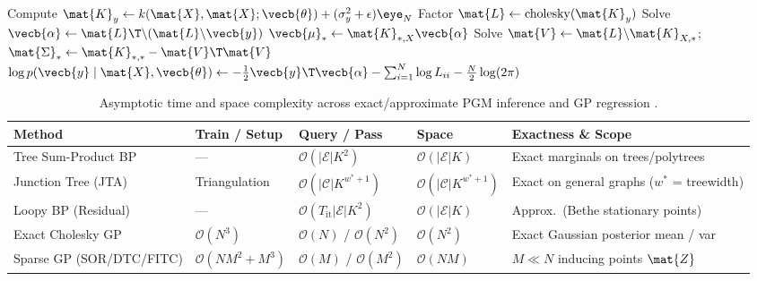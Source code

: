 \documentclass[../../../../master.tex]{subfiles}
\begin{document}
\begin{algorithm}[htbp]
\caption{Numerically Stable Cholesky GP Regression \& Marginal Likelihood}
\label{alg:pgmgp:cholesky_gp}
Compute $\mat{K}_y \gets k(\mat{X}, \mat{X}; \vecb{\theta}) + (\sigma_y^2 + \epsilon)\eye_N$\;
Factor $\mat{L} \gets \mathrm{cholesky}(\mat{K}_y)$ 
Solve $\vecb{\alpha} \gets \mat{L}\T \backslash (\mat{L} \backslash \vecb{y})$ 
$\vecb{\mu}_* \gets \mat{K}_{*,X} \vecb{\alpha}$\;
Solve $\mat{V} \gets \mat{L} \backslash \mat{K}_{X,*}$; \quad $\mat{\Sigma}_* \gets \mat{K}_{*,*} - \mat{V}\T \mat{V}$\;
$\log p(\vecb{y} \mid \mat{X}, \vecb{\theta}) \gets -\frac{1}{2}\vecb{y}\T\vecb{\alpha} - \sum_{i=1}^N \log L_{ii} - \frac{N}{2}\log(2\pi)$\;
\end{algorithm}

\begin{table}[htbp]
\centering
\caption{Asymptotic time and space complexity across exact/approximate PGM inference and GP regression .}
\label{tab:pgmgp:complexity}
{\small
\begin{tabularx}{\textwidth}{@{}>{\raggedright\arraybackslash}p{3.0cm} l l l >{\raggedright\arraybackslash}X@{}}
\toprule
\textbf{Method} & \textbf{Train / Setup} & \textbf{Query / Pass} & \textbf{Space} & \textbf{Exactness \& Scope} \\
\midrule
Tree Sum-Product BP & --- & $\mathcal{O}(|\mathcal{E}| K^2)$ & $\mathcal{O}(|\mathcal{E}| K)$ & Exact marginals on trees/polytrees \\
Junction Tree (JTA) & Triangulation & $\mathcal{O}(|\mathcal{C}| K^{w^*+1})$ & $\mathcal{O}(|\mathcal{C}| K^{w^*+1})$ & Exact on general graphs ($w^*$ = treewidth) \\
Loopy BP (Residual) & --- & $\mathcal{O}(T_{\mathrm{it}}|\mathcal{E}| K^2)$ & $\mathcal{O}(|\mathcal{E}| K)$ & Approx.\ (Bethe stationary points) \\
Exact Cholesky GP & $\mathcal{O}(N^3)$ & $\mathcal{O}(N)$ / $\mathcal{O}(N^2)$ & $\mathcal{O}(N^2)$ & Exact Gaussian posterior mean / var \\
Sparse GP (SOR/DTC/FITC) & $\mathcal{O}(NM^2 + M^3)$ & $\mathcal{O}(M)$ / $\mathcal{O}(M^2)$ & $\mathcal{O}(NM)$ & $M \ll N$ inducing points $\mat{Z}$ \\
\bottomrule
\end{tabularx}}
\end{table}
\end{document}
